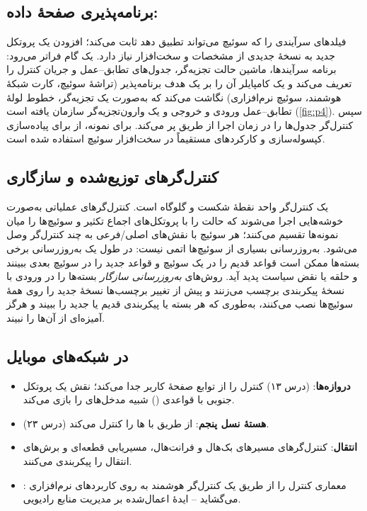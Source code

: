 \documentclass[11pt,a4paper]{article}
\begin{document}
\subsection{برنامه‌پذیری صفحهٔ داده: }
 فیلدهای سرآیندی را که سوئیچ می‌تواند تطبیق دهد ثابت می‌کند؛ افزودن یک پروتکل جدید به نسخهٔ جدیدی از مشخصات و
سخت‌افزار نیاز دارد.  \cite{bosshart2014p4} یک گام فراتر می‌رود: برنامه سرآیندها، ماشین حالت تجزیه‌گر، جدول‌های
تطابق--عمل و جریان کنترل را تعریف می‌کند و یک کامپایلر آن را بر یک هدف برنامه‌پذیر (تراشهٔ سوئیچ، کارت شبکهٔ هوشمند، سوئیچ
نرم‌افزاری) نگاشت می‌کند که به‌صورت یک تجزیه‌گر، خطوط لولهٔ تطابق--عمل ورودی و خروجی و یک وارون‌تجزیه‌گر سازمان یافته است
(\cref{fig:p4}). سپس کنترل‌گر جدول‌ها را در زمان اجرا از طریق  پر می‌کند. برای نمونه، از  برای
پیاده‌سازی کپسوله‌سازی  و کارکردهای  مستقیماً در سخت‌افزار سوئیچ استفاده شده است.

\begin{acnfigure}
  \caption{معماری سوئیچ مستقل از پروتکل که با  برنامه‌ریزی می‌شود.}
  \label{fig:p4}
\end{acnfigure}

\subsection{کنترل‌گرهای توزیع‌شده و سازگاری}
یک کنترل‌گر واحد نقطهٔ شکست و گلوگاه است. کنترل‌گرهای عملیاتی به‌صورت خوشه‌هایی اجرا می‌شوند که حالت را با پروتکل‌های
اجماع تکثیر و سوئیچ‌ها را میان نمونه‌ها تقسیم می‌کنند؛ هر سوئیچ با نقش‌های اصلی/فرعی به چند کنترل‌گر وصل می‌شود.
به‌روزرسانی بسیاری از سوئیچ‌ها اتمی نیست: در طول یک به‌روزرسانی برخی بسته‌ها ممکن است قواعد قدیم را در یک سوئیچ و قواعد
جدید را در سوئیچ بعدی ببینند و حلقه یا نقض سیاست پدید آید. روش‌های \emph{به‌روزرسانی سازگار} بسته‌ها را در ورودی با نسخهٔ
پیکربندی برچسب می‌زنند و پیش از تغییر برچسب‌ها نسخهٔ جدید را روی همهٔ سوئیچ‌ها نصب می‌کنند، به‌طوری که هر بسته یا
پیکربندی قدیم یا جدید را ببیند و هرگز آمیزه‌ای از آن‌ها را نبیند.

\subsection{ در شبکه‌های موبایل}
\begin{itemize}
  \item \textbf{دروازه‌ها}:  (درس ۱۳) کنترل  را از توابع صفحهٔ کاربر جدا می‌کند؛  نقش یک
        پروتکل جنوبی با قواعدی () شبیه مدخل‌های  را بازی می‌کند.
  \item \textbf{هستهٔ نسل پنجم}:  از طریق  با  ها را کنترل می‌کند (درس ۲۳).
  \item \textbf{انتقال}: کنترل‌گرهای  مسیرهای بک‌هال و فرانت‌هال، مسیریابی قطعه‌ای و برش‌های انتقال را پیکربندی
        می‌کنند.
  \item \textbf{}: معماری  کنترل  را از طریق یک کنترل‌گر هوشمند  به روی کاربردهای
        نرم‌افزاری می‌گشاید -- ایدهٔ  اعمال‌شده بر مدیریت منابع رادیویی.
\end{itemize}
\end{document}
